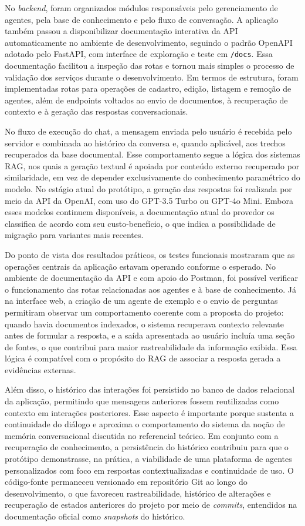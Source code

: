 \documentclass[12pt, openright, oneside, a4paper, brazil]{ads-unipac-abntex2}
\begin{document}
No \textit{backend}, foram organizados módulos responsáveis pelo gerenciamento de agentes, pela base de conhecimento e pelo fluxo de conversação. A aplicação também passou a disponibilizar documentação interativa da API automaticamente no ambiente de desenvolvimento, seguindo o padrão OpenAPI adotado pelo FastAPI, com interface de exploração e teste em \verb|/docs|. Essa documentação facilitou a inspeção das rotas e tornou mais simples o processo de validação dos serviços durante o desenvolvimento. Em termos de estrutura, foram implementadas rotas para operações de cadastro, edição, listagem e remoção de agentes, além de endpoints voltados ao envio de documentos, à recuperação de contexto e à geração das respostas conversacionais. 

No fluxo de execução do chat, a mensagem enviada pelo usuário é recebida pelo servidor e combinada ao histórico da conversa e, quando aplicável, aos trechos recuperados da base documental. Esse comportamento segue a lógica dos sistemas RAG, nos quais a geração textual é apoiada por conteúdo externo recuperado por similaridade, em vez de depender exclusivamente do conhecimento paramétrico do modelo. No estágio atual do protótipo, a geração das respostas foi realizada por meio da API da OpenAI, com uso do GPT-3.5 Turbo ou GPT-4o Mini. Embora esses modelos continuem disponíveis, a documentação atual do provedor os classifica de acordo com seu custo-benefício, o que indica a possibilidade de migração para variantes mais recentes. 

Do ponto de vista dos resultados práticos, os testes funcionais mostraram que as operações centrais da aplicação estavam operando conforme o esperado. No ambiente de documentação da API e com apoio do Postman, foi possível verificar o funcionamento das rotas relacionadas aos agentes e à base de conhecimento. Já na interface web, a criação de um agente de exemplo e o envio de perguntas permitiram observar um comportamento coerente com a proposta do projeto: quando havia documentos indexados, o sistema recuperava contexto relevante antes de formular a resposta, e a saída apresentada ao usuário incluía uma seção de fontes, o que contribui para maior rastreabilidade da informação exibida. Essa lógica é compatível com o propósito do RAG de associar a resposta gerada a evidências externas. 

Além disso, o histórico das interações foi persistido no banco de dados relacional da aplicação, permitindo que mensagens anteriores fossem reutilizadas como contexto em interações posteriores. Esse aspecto é importante porque sustenta a continuidade do diálogo e aproxima o comportamento do sistema da noção de memória conversacional discutida no referencial teórico. Em conjunto com a recuperação de conhecimento, a persistência do histórico contribuiu para que o protótipo demonstrasse, na prática, a viabilidade de uma plataforma de agentes personalizados com foco em respostas contextualizadas e continuidade de uso. O código-fonte permaneceu versionado em repositório Git ao longo do desenvolvimento, o que favoreceu rastreabilidade, histórico de alterações e recuperação de estados anteriores do projeto por meio de \textit{commits}, entendidos na documentação oficial como \textit{snapshots} do histórico. 
\end{document}
